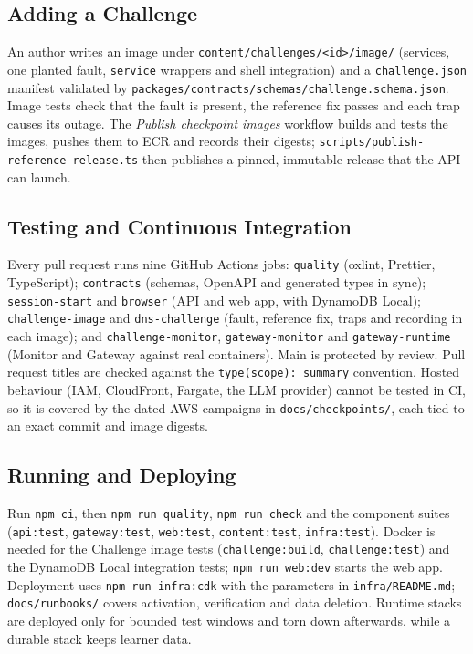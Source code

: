 \documentclass[11pt,a4paper]{article}
\begin{document}
\subsection{Adding a Challenge}
An author writes an image under \nolinkurl{content/challenges/<id>/image/} (services,
one planted fault, \nolinkurl{service} wrappers and shell integration) and a
\nolinkurl{challenge.json} manifest validated by
\nolinkurl{packages/contracts/schemas/challenge.schema.json}. Image tests check that the
fault is present, the reference fix passes and each trap causes its outage. The
\emph{Publish checkpoint images} workflow builds and tests the images, pushes them
to ECR and records their digests; \nolinkurl{scripts/publish-reference-release.ts}
then publishes a pinned, immutable release that the API can launch.

\subsection{Testing and Continuous Integration}
Every pull request runs nine GitHub Actions jobs: \nolinkurl{quality} (oxlint,
Prettier, TypeScript); \nolinkurl{contracts} (schemas, OpenAPI and generated types in
sync); \nolinkurl{session-start} and \nolinkurl{browser} (API and web app, with
DynamoDB Local); \nolinkurl{challenge-image} and \nolinkurl{dns-challenge} (fault,
reference fix, traps and recording in each image); and \nolinkurl{challenge-monitor},
\nolinkurl{gateway-monitor} and \nolinkurl{gateway-runtime} (Monitor and Gateway against
real containers). Main is protected by review. Pull request titles are checked against the \texttt{type(scope): summary}
convention. Hosted behaviour (IAM, CloudFront, Fargate, the LLM provider) cannot
be tested in CI, so it is covered by the dated AWS campaigns in
\nolinkurl{docs/checkpoints/}, each tied to an exact commit and image digests.

\subsection{Running and Deploying}
Run \texttt{npm ci}, then \texttt{npm run quality}, \texttt{npm run check} and
the component suites (\nolinkurl{api:test}, \nolinkurl{gateway:test}, \nolinkurl{web:test},
\nolinkurl{content:test}, \nolinkurl{infra:test}). Docker is needed for the Challenge
image tests (\nolinkurl{challenge:build}, \nolinkurl{challenge:test}) and the DynamoDB
Local integration tests; \texttt{npm run web:dev} starts the web app.
Deployment uses \texttt{npm run infra:cdk} with the parameters in
\nolinkurl{infra/README.md}; \nolinkurl{docs/runbooks/} covers activation, verification and
data deletion. Runtime stacks are deployed only for bounded test windows and torn
down afterwards, while a durable stack keeps learner data.
\end{document}
